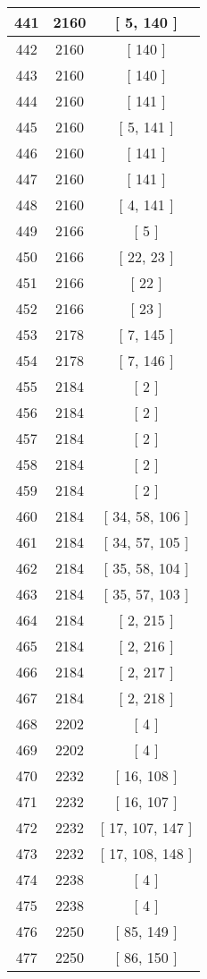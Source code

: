 \begin{center}
\begin{longtable}[H]{|| c c c ||}
441 & 2160 & [ 5, 140 ]
\\\hline
442 & 2160 & [ 140 ]
\\\hline
443 & 2160 & [ 140 ]
\\\hline
444 & 2160 & [ 141 ]
\\\hline
445 & 2160 & [ 5, 141 ]
\\\hline
446 & 2160 & [ 141 ]
\\\hline
447 & 2160 & [ 141 ]
\\\hline
448 & 2160 & [ 4, 141 ]
\\\hline
449 & 2166 & [ 5 ]
\\\hline
450 & 2166 & [ 22, 23 ]
\\\hline
451 & 2166 & [ 22 ]
\\\hline
452 & 2166 & [ 23 ]
\\\hline
453 & 2178 & [ 7, 145 ]
\\\hline
454 & 2178 & [ 7, 146 ]
\\\hline
455 & 2184 & [ 2 ]
\\\hline
456 & 2184 & [ 2 ]
\\\hline
457 & 2184 & [ 2 ]
\\\hline
458 & 2184 & [ 2 ]
\\\hline
459 & 2184 & [ 2 ]
\\\hline
460 & 2184 & [ 34, 58, 106 ]
\\\hline
461 & 2184 & [ 34, 57, 105 ]
\\\hline
462 & 2184 & [ 35, 58, 104 ]
\\\hline
463 & 2184 & [ 35, 57, 103 ]
\\\hline
464 & 2184 & [ 2, 215 ]
\\\hline
465 & 2184 & [ 2, 216 ]
\\\hline
466 & 2184 & [ 2, 217 ]
\\\hline
467 & 2184 & [ 2, 218 ]
\\\hline
468 & 2202 & [ 4 ]
\\\hline
469 & 2202 & [ 4 ]
\\\hline
470 & 2232 & [ 16, 108 ]
\\\hline
471 & 2232 & [ 16, 107 ]
\\\hline
472 & 2232 & [ 17, 107, 147 ]
\\\hline
473 & 2232 & [ 17, 108, 148 ]
\\\hline
474 & 2238 & [ 4 ]
\\\hline
475 & 2238 & [ 4 ]
\\\hline
476 & 2250 & [ 85, 149 ]
\\\hline
477 & 2250 & [ 86, 150 ]

\end{longtable}
\end{center}
